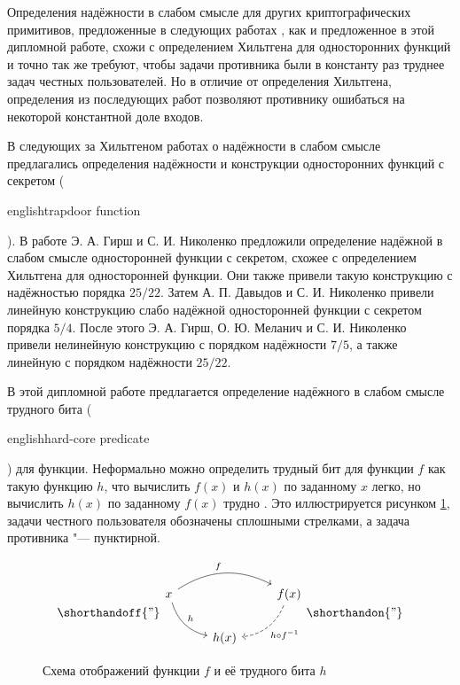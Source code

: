 \documentclass[oneside, a4paper]{article}
\theoremstyle{plain}
\theoremstyle{remark}
\begin{document}

Определения надёжности в слабом смысле для других криптографических примитивов,
предложенные в следующих работах \cite{HN09,DN11,hirsch_milanich_nikolenko},
как и предложенное в этой дипломной работе, схожи с определением Хильтгена для
односторонних функций и точно так же требуют, чтобы задачи противника были в
константу раз труднее задач честных пользователей. Но в отличие от определения
Хильтгена, определения из последующих работ позволяют противнику ошибаться на
некоторой константной доле входов.

В следующих за Хильтгеном работах о надёжности в слабом смысле предлагались
определения надёжности и конструкции односторонних функций с секретом
(\begin{foreignlanguage}{english}trapdoor function\end{foreignlanguage}). В
работе \cite{HN09} Э. А. Гирш и С. И. Николенко предложили определение надёжной
в слабом смысле односторонней функции с секретом, схожее с определением
Хильтгена для односторонней функции. Они также привели такую конструкцию с
надёжностью порядка $25/22$. Затем \cite{DN11} А. П. Давыдов и С. И. Николенко
привели линейную конструкцию слабо надёжной односторонней функции с секретом
порядка $5/4$. После этого Э. А. Гирш, О. Ю. Меланич и С. И. Николенко
\cite{hirsch_milanich_nikolenko} привели нелинейную конструкцию с порядком
надёжности $7/5$, а также линейную с порядком надёжности $25/22$.

В этой дипломной работе предлагается определение надёжного в слабом
смысле трудного бита (\begin{foreignlanguage}{english}hard-core
predicate\end{foreignlanguage}) для функции. Неформально можно определить
трудный бит для функции $f$ как такую функцию $h$, что вычислить $f(x)$ и
$h(x)$ по заданному $x$ легко, но вычислить $h(x)$ по заданному $f(x)$ трудно
\cite{goldreich}. Это иллюстрируется рисунком \ref{fig_hp}, задачи честного
пользователя обозначены сплошными стрелками, а задача противника "---
пунктирной.

\begin{figure}[h]
\[
\shorthandoff{"}
\begin{tikzcd}
x \arrow[rr, bend left, "f"] \arrow[rd, bend right, "h"] & ~ & f(x) \arrow[ld, bend left, dashrightarrow, "h \circ f^{-1}"] \\
~ & h(x) & ~
\end{tikzcd}
\shorthandon{"}
\]
\caption{Схема отображений функции $f$ и её трудного бита $h$}
\label{fig_hp}
\end{figure}
\end{document}
